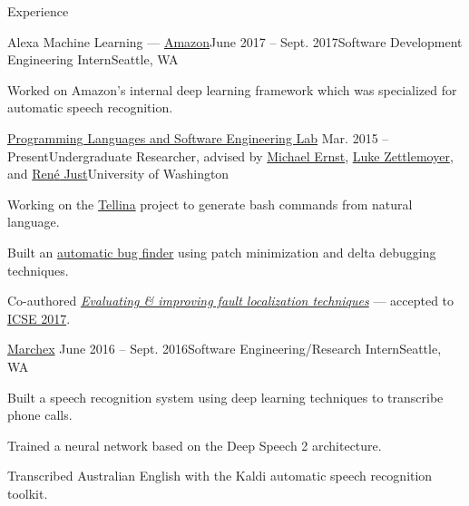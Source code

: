 \documentclass{resume} %
\begin{document}

\begin{rSection}{Experience}

  \begin{rSubsection}{Alexa Machine Learning --- {\href{https://www.amazon.com/}{Amazon}}}{June 2017 -- Sept. 2017}{Software Development Engineering Intern}{Seattle, WA}
    \item Worked on Amazon's internal deep learning framework which was specialized for automatic
    speech recognition.
  \end{rSubsection}

  \begin{rSubsection}{\href{https://uwplse.org/}{Programming Languages and Software Engineering Lab}}
    {Mar. 2015 -- Present}{Undergraduate Researcher, advised by \href{https://homes.cs.washington.edu/~mernst/}{Michael Ernst}, \href{https://www.cs.washington.edu/people/faculty/lsz}{Luke Zettlemoyer}, and \href{https://people.cs.umass.edu/~rjust/}{Ren{\'e} Just}}{University of Washington}
  \item Working on the \href{https://github.com/TellinaTool}{Tellina} project to generate bash commands from natural language.
  \item Built an \href{https://github.com/dericp/patch-minimization}{automatic bug finder} using patch minimization and delta debugging techniques.
  \item Co-authored \href{https://homes.cs.washington.edu/~dericp/resources/fault-localization-tr160803.pdf}{\emph{Evaluating \& improving fault localization techniques}} --- accepted to \href{http://icse2017.gatech.edu/}{ICSE 2017}.
  \end{rSubsection}
  
  \begin{rSubsection}{\href{http://www.marchex.com/}{Marchex}}
    {June 2016 -- Sept. 2016}{Software Engineering/Research Intern}{Seattle, WA}
  \item Built a speech recognition system using deep learning techniques to transcribe phone calls.
  \item Trained a neural network based on the Deep Speech 2 architecture.
  \item Transcribed Australian English with the Kaldi automatic speech recognition toolkit.
  \end{rSubsection}


\end{rSection}
\end{document}
